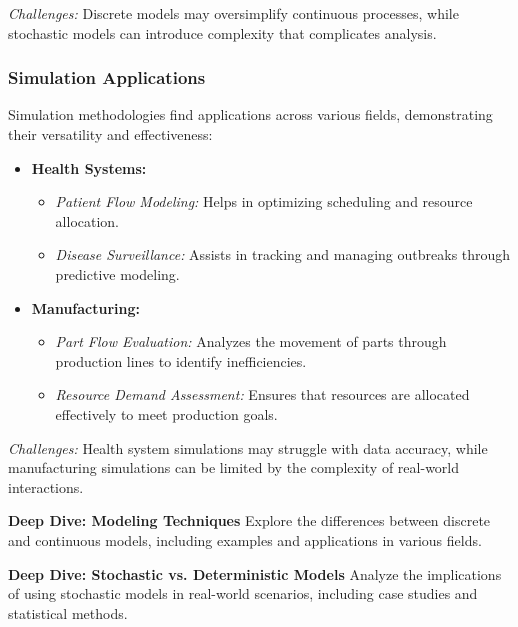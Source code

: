 \textit{Challenges:} Discrete models may oversimplify continuous processes, while stochastic models can introduce complexity that complicates analysis.

\subsubsection{Simulation Applications}

Simulation methodologies find applications across various fields, demonstrating their versatility and effectiveness:

\begin{itemize}
    \item \textbf{Health Systems:} 
    \begin{itemize}
        \item \textit{Patient Flow Modeling:} Helps in optimizing scheduling and resource allocation.
        \item \textit{Disease Surveillance:} Assists in tracking and managing outbreaks through predictive modeling.
    \end{itemize}
    
    \item \textbf{Manufacturing:} 
    \begin{itemize}
        \item \textit{Part Flow Evaluation:} Analyzes the movement of parts through production lines to identify inefficiencies.
        \item \textit{Resource Demand Assessment:} Ensures that resources are allocated effectively to meet production goals.
    \end{itemize}
\end{itemize}

\textit{Challenges:} Health system simulations may struggle with data accuracy, while manufacturing simulations can be limited by the complexity of real-world interactions.

\begin{mdframed}[style=detailsstyle]
\textbf{Deep Dive: Modeling Techniques}
Explore the differences between discrete and continuous models, including examples and applications in various fields.
\end{mdframed}

\begin{mdframed}[style=detailsstyle]
\textbf{Deep Dive: Stochastic vs. Deterministic Models}
Analyze the implications of using stochastic models in real-world scenarios, including case studies and statistical methods.
\end{mdframed}
